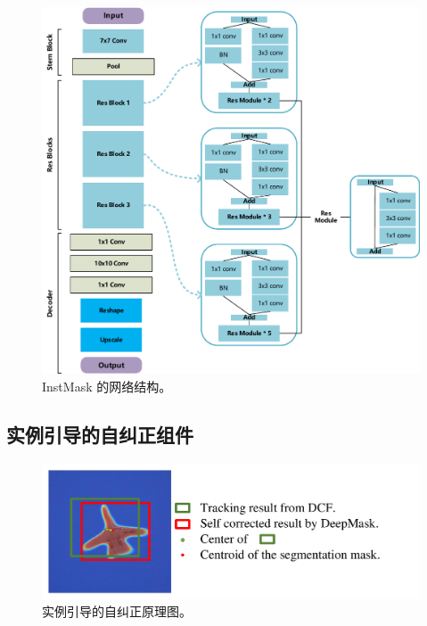 \begin{figure}
    \centering
    \includegraphics[width=1.0\textwidth]{Img/IGCF/net.pdf}
    \caption{InstMask 的网络结构。}
    \label{fig:net}
\end{figure}

\subsection{实例引导的自纠正组件} \label{sec:cog}

\begin{figure}
    \centering
    \includegraphics[width=1.0\textwidth]{Img/IGCF/cog.pdf}
    \caption{实例引导的自纠正原理图。}
    \label{fig:net}
\end{figure}

